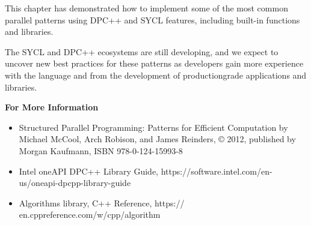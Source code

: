 



This chapter has demonstrated how to implement some of the most common parallel patterns using DPC++ and SYCL features, including built-in functions and libraries.\par

The SYCL and DPC++ ecosystems are still developing, and we expect to uncover new best practices for these patterns as developers gain more experience with the language and from the development of productiongrade applications and libraries.\par


\hspace*{\fill} \par %
\textbf{For More Information}

\begin{itemize}
	\item Structured Parallel Programming: Patterns for Efficient Computation by Michael McCool, Arch Robison, and James Reinders, © 2012, published by Morgan Kaufmann, ISBN 978-0-124-15993-8
	\item Intel oneAPI DPC++ Library Guide,  https://software.intel.com/en-us/oneapi-dpcpp-library-guide
	\item Algorithms library, C++ Reference, https://	en.cppreference.com/w/cpp/algorithm
\end{itemize}









\newpage